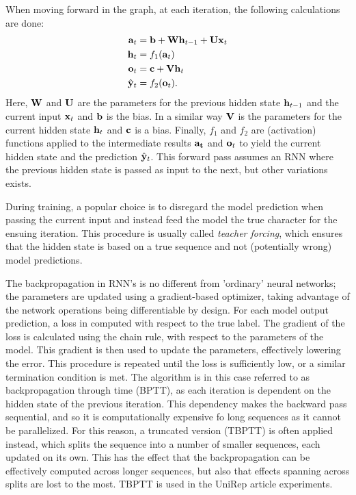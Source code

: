 \documentclass[a4paper,12pt]{article}
\begin{document}
When moving forward in the graph, at each iteration, the following calculations are done:
\begin{align*}
    \mathbf{ a }_t &= \mathbf{ b } + \mathbf{ Wh }_{t - 1} + \mathbf{ Ux }_t\\
    \mathbf{ h }_t &= f_1 {\mathopen{} \left( \mathbf{ a }_t \right) \mathclose{}}\\
    \mathbf{ o }_t &= \mathbf{ c } + \mathbf{ Vh }_t\\
    \hat{\mathbf{ y }}_t &= f_2 {\mathopen{} \left( \mathbf{ o }_t \right) \mathclose{}}.
\end{align*}
Here, $\mathbf{ W }$ and $\mathbf{ U }$ are the parameters for the previous hidden state $\mathbf{ h }_{t-1}$ and the current input $\mathbf{ x }_t$ and $\mathbf{ b }$ is the bias. In a similar way $\mathbf{ V }$ is the parameters for the current hidden state $\mathbf{ h }_t$ and $\mathbf{ c }$ is a bias. Finally, $f_1$ and $f_2$ are (activation) functions applied to the intermediate results $\mathbf{ a_t }$ and $\mathbf{ o }_t$ to yield the current hidden state and the prediction $\hat{\mathbf{ y }}_t$. This forward pass assumes an RNN where the previous hidden state is passed as input to the next, but other variations exists.

During training, a popular choice is to disregard the model prediction when passing the current input and instead feed the model the true character for the ensuing iteration. This procedure is usually called \textit{teacher forcing}, which ensures that the hidden state is based on a true sequence and not (potentially wrong) model predictions.

The backpropagation in RNN's is no different from 'ordinary' neural networks; the parameters are updated using a gradient-based optimizer, taking advantage of the network operations being differentiable by design. For each model output prediction, a loss in computed with respect to the true label. The gradient of the loss is calculated using the chain rule, with respect to the parameters of the model. This gradient is then used to update the parameters, effectively lowering the error. This procedure is repeated until the loss is sufficiently low, or a similar termination condition is met. The algorithm is in this case referred to as backpropagation through time (BPTT), as each iteration is dependent on the hidden state of the previous iteration. This dependency makes the backward pass sequential, and so it is computationally expensive fo long sequences as it cannot be parallelized. For this reason, a truncated version (TBPTT) is often applied instead, which splits the sequence into a number of smaller sequences, each updated on its own. This has the effect that the backpropagation can be effectively computed across longer sequences, but also that effects spanning across splits are lost to the most. TBPTT is used in the UniRep article experiments.
\end{document}

